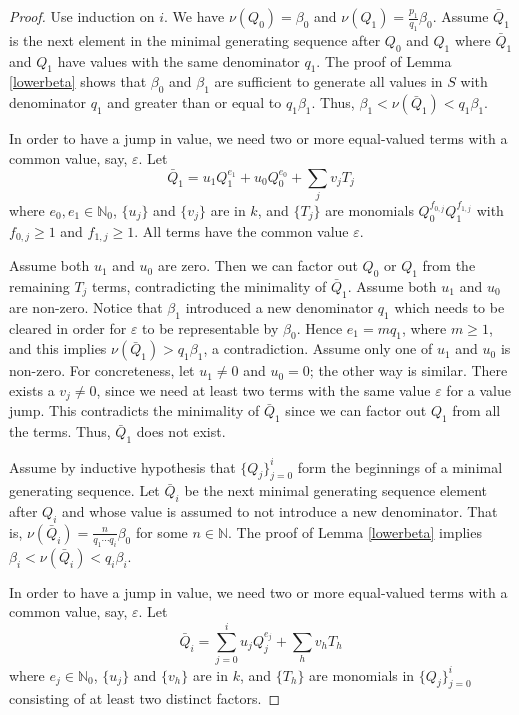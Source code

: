 \documentclass[11pt]{amsart}
\theoremstyle{definition}
\begin{document}
{\begin{proof}
Use induction on $i$. We have $\nu(Q_0)=\beta_0$ and $\nu(Q_1)=\frac{p_1}{q_1}\beta_0$. Assume $\bar Q_1$ is the next element in the minimal generating sequence after $Q_0$ and $Q_1$ where $\bar Q_1$ and $Q_1$ have values with the same denominator $q_1$. The proof of Lemma \ref{lowerbeta} shows that $\beta_0$ and $\beta_1$ are sufficient to generate all values in $S$ with denominator $q_1$ and greater than or equal to $q_1\beta_1$. Thus, $\beta_1 < \nu(\bar Q_1) < q_1\beta_1$.

In order to have a jump in value, we need two or more equal-valued terms with a common value, say, $\varepsilon$. Let
\begin{equation*}
\bar Q_1 = u_1 Q_1^{e_1} + u_0 Q_0^{e_0} + \sum_j v_j T_j
\end{equation*}
where $e_0,e_1\in\mathbb{N}_0$, $\{u_j\}$ and $\{v_j\}$ are in $k$, and $\{T_j\}$ are monomials $Q_0^{f_{0,j}}Q_1^{f_{1,j}}$ with $f_{0,j}\geq 1$ and $f_{1,j} \geq 1$. All terms have the common value $\varepsilon$.

Assume both $u_1$ and $u_0$ are zero. Then we can factor out $Q_0$ or $Q_1$ from the remaining $T_j$ terms, contradicting the minimality of $\bar Q_1$. Assume both $u_1$ and $u_0$ are non-zero. Notice that $\beta_1$ introduced a new denominator $q_1$ which needs to be cleared in order for $\varepsilon$ to be representable by $\beta_0$. Hence $e_1=mq_1$, where $m\geq 1$, and this implies $\nu(\bar Q_1) > q_1\beta_1$, a contradiction. Assume only one of $u_1$ and $u_0$ is non-zero. For concreteness, let $u_1\neq0$ and $u_0=0$; the other way is similar. There exists a $v_j\neq 0$, since we need at least two terms with the same value $\varepsilon$ for a value jump. This contradicts the minimality of $\bar Q_1$ since we can factor out $Q_1$ from all the terms. Thus, $\bar Q_1$ does not exist.

Assume by inductive hypothesis that $\displaystyle \{Q_j\}_{j=0}^i$ form the beginnings of a minimal generating sequence. Let $\bar Q_i$ be the next minimal generating sequence element after $Q_i$ and whose value is assumed to not introduce a new denominator. That is, $\displaystyle \nu(\bar Q_i)=\frac{n}{q_1\cdots q_i}\beta_0$ for some $n\in\mathbb{N}$. The proof of Lemma \ref{lowerbeta} implies $\beta_i < \nu(\bar Q_i) < q_i\beta_i$.

In order to have a jump in value, we need two or more equal-valued terms with a common value, say, $\varepsilon$. Let
\begin{equation*}
\bar Q_i = \sum_{j=0}^{i} u_j Q_j^{e_j} + \sum_h v_h T_h
\end{equation*}
where $e_j\in\mathbb{N}_0$, $\{u_j\}$ and $\{v_h\}$ are in $k$, and $\{T_h\}$ are monomials in $\{Q_j\}_{j=0}^i$ consisting of at least two distinct factors.


\end{proof}}
\end{document}
